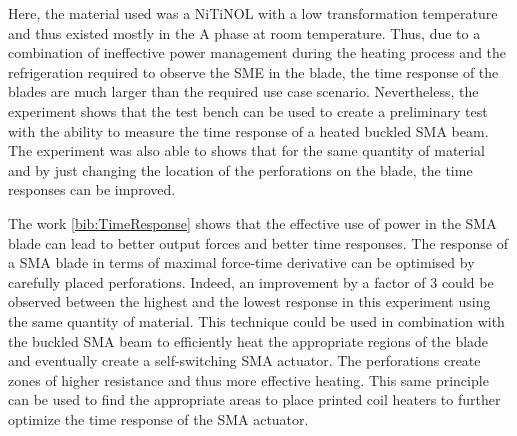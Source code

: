 Here, the material used was a NiTiNOL with a low transformation temperature and thus existed mostly in the A phase at room temperature. Thus, due to a combination of ineffective power management during the heating process and the refrigeration required to observe the SME in the blade, the time response of the blades are much larger than the required use case scenario. Nevertheless, the experiment shows that the test bench can be used to create a preliminary test with the ability to measure the time response of a heated buckled SMA beam. The experiment was also able to shows that for the same quantity of material and by just changing the location of the perforations on the blade, the time responses can be improved.

The work \ref{bib:TimeResponse} shows that the effective use of power in the SMA blade can lead to better output forces and better time responses. The response of a SMA blade in terms of maximal force-time derivative can be optimised by carefully placed perforations. Indeed, an improvement by a factor of 3 could be observed between the highest and the lowest response in this experiment using the same quantity of material. This technique could be used in combination with the buckled SMA beam to efficiently heat the appropriate regions of the blade and eventually create a self-switching SMA actuator. The perforations create zones of higher resistance and thus more effective heating. This same principle can be used to find the appropriate areas to place printed coil heaters to further optimize the time response of the SMA actuator.
